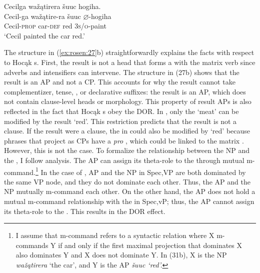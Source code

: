\documentclass[output=paper]{LSP/langsci}
\begin{document}
\begin{exe}
\ex\label{ex:rosen:27}
\begin{xlist}

\ex \glll Cecilga wažątirera šuuc hogiha. \\
Cecil-ga  wažątire-ra šuuc {$\varnothing$}-hogiha \\
Cecil-\textsc{prop} car-\textsc{def} red \textsc{3s/o}-paint\\
\glt `Cecil painted the car red.'

\ex 
{\hspace{1em}}\newline
{}
\end{xlist}
\end{exe}
 
The structure in (\ref{ex:rosen:27}b) straightforwardly explains the facts with respect to Ho\-cąk s. First, the result is not a head that forms a  with the matrix verb since adverbs and intensifiers can intervene. The structure in (27b) shows that the result is an AP and not a CP. This accounts for why the result cannot take complementizer, tense, , or declarative suffixes: the result is an AP, which does not contain clause-level heads or morphology. This property of result APs is also reflected in the fact that Hocąk s obey the DOR. In , only the  `meat' can be modified by the result `red'. This restriction predicts that the result is not a clause. If the result were a clause, the  in  could also be modified by `red' because  phrases that project as CPs have a \textit{pro} , which could be linked to the matrix . However, this is not the case. To formalize the relationship between the NP  and the , I follow  analysis. The AP can assign its theta-role to the  through mutual m-command.\footnote{I assume that m-command refers to a syntactic relation where X m-commands Y if and only if the first maximal projection that dominates X also dominates Y and X does not dominate Y. In (31b), X is the NP \textit{wažątirera} `the car', and Y is the AP \textit{šuuc `red'.}} In the case of , AP and the NP in Spec,VP are both dominated by the same VP node, and they do not dominate each other. Thus, the AP and the  NP mutually m-command each other. On the other hand, the AP does not hold a mutual m-command relationship with the  in Spec,vP; thus, the AP cannot assign its theta-role to the . This results in the DOR effect.
 
\end{document}
